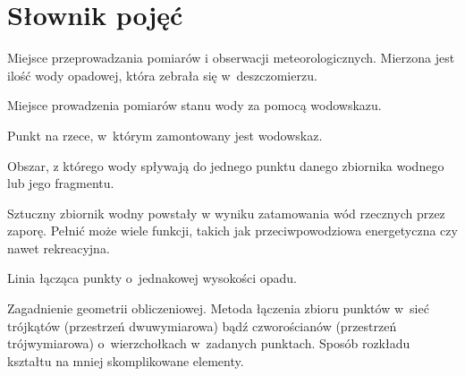 \chapter{Słownik pojęć}
\begin{description}[leftmargin=6cm]

\item[Posterunek opadowy]
Miejsce przeprowadzania pomiarów i obserwacji meteorologicznych. Mierzona jest ilość wody opadowej, która zebrała się w~deszczomierzu.

\item[Posterunek wodowskazowy]
Miejsce prowadzenia pomiarów stanu wody za pomocą wodowskazu.

\item[Profil wodowskazowy]
Punkt na rzece, w~którym zamontowany jest wodowskaz.

\item[Zlewnia]
Obszar, z którego wody spływają do jednego punktu danego zbiornika wodnego lub jego fragmentu.

\item[Zbiornik retencyjny]
Sztuczny zbiornik wodny powstały w wyniku zatamowania wód rzecznych przez zaporę. Pełnić może wiele funkcji, takich jak przeciwpowodziowa energetyczna czy nawet rekreacyjna.


\item[Izohieta]
Linia łącząca punkty o~jednakowej wysokości opadu.

\item[Triangulacja]
Zagadnienie geometrii obliczeniowej. Metoda łączenia zbioru punktów w~sieć trójkątów (przestrzeń dwuwymiarowa) bądź czworościanów (przestrzeń trójwymiarowa) o~wierzchołkach w~zadanych punktach. Sposób rozkładu kształtu na mniej skomplikowane elementy.
\end{description}